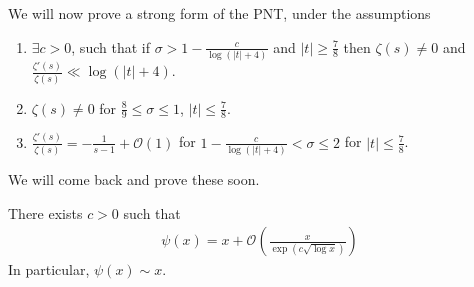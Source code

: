 \documentclass{article}
\newcommand{\1}{\mathbbm{1}}
\newcommand{\bigO}{\mathcal{O}}
\begin{document}
We will now prove a strong form of the PNT, under the assumptions
\begin{enumerate}
  \item $\exists c > 0$, such that if $\sigma > 1 - \frac{c}{\log(|t|+4)}$ and $|t| \geq \frac{7}{8}$ then $\zeta(s) \neq 0$ and  $\frac{\zeta'(s)}{\zeta(s)} \ll \log(|t|+4)$.
  \item $\zeta(s) \neq 0$ for $\frac{8}{9} \leq \sigma \leq 1$, $|t| \leq \frac{7}{8}$.
  \item $\frac{\zeta'(s)}{\zeta(s)} = -\frac{1}{s-1} + \bigO(1)$ for $1 - \frac{c}{\log(|t|+4)} < \sigma \leq 2$ for $|t| \leq \frac{7}{8}$.
\end{enumerate}
We will come back and prove these soon.

\begin{thm}
  There exists $c > 0$ such that
  \begin{align*}
    \psi(x) = x + \bigO\left(\frac{x}{\exp(c \sqrt{\log x})}\right)
  \end{align*}
  In particular, $\psi(x) \sim x$.
\end{thm}
\end{document}

